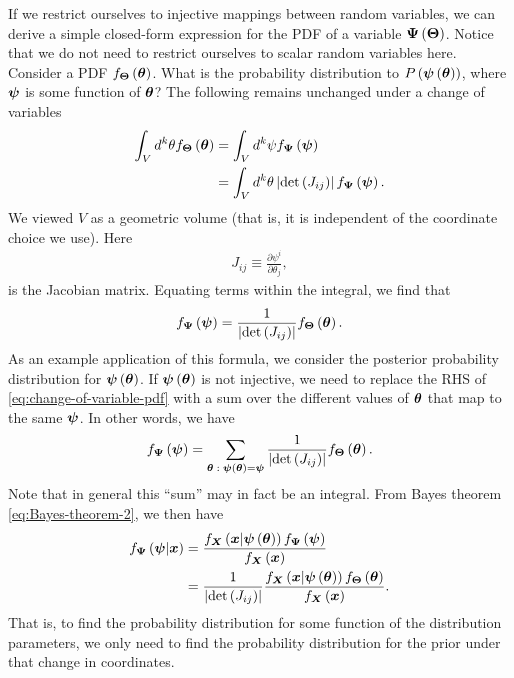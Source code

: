 If we restrict ourselves to injective mappings between random variables, we can derive a simple closed-form expression for the PDF of a variable ${\bm \Psi}\left({\bm \Theta}\right)$.
Notice that we do not need to restrict ourselves to scalar random variables here.
Consider a PDF $f_{{\bm \Theta}}\left({\bm \theta}\right)$.
What is the probability distribution to $P\left({\bm \psi}\left({\bm \theta}\right)\right)$,
where ${\bm \psi}$ is some function of ${\bm \theta}$?
The following remains unchanged under a change of variables
\begin{align}
    \int_V d^k\theta f_{{\bm \Theta}}\left({\bm \theta}\right)
    &=
    \int_{V} d^k\psi f_{{\bm \Psi}}\left({\bm \psi}\right)
    \nonumber\\
    &=
    \int_{V} d^k\theta \left|\det\left(J_{ij}\right)\right| 
        f_{{\bm \Psi}}\left({\bm \psi}\right)
    .
\end{align}
We viewed $V$ as a geometric volume (that is, it is independent of the coordinate choice we use).
Here 
\begin{align}
    \label{eq:Jacobian-matrix}
    J_{ij}
    \equiv
    \frac{\partial\psi^i}{\partial\theta_j}
    ,
\end{align}
is the Jacobian matrix.
Equating terms within the integral, we find that
\begin{align}
    \label{eq:change-of-variable-pdf}
    f_{{\bm \Psi}}\left({\bm \psi}\right)
    =
    \frac{1}{\left|\det\left(J_{ij}\right)\right|} f_{{\bm \Theta}}\left({\bm \theta}\right)
    .
\end{align}
As an example application of this formula, we consider the posterior probability distribution for ${\bm \psi}\left({\bm \theta}\right)$. 
If ${\bm \psi}\left({\bm \theta}\right)$ is not injective, we need to replace the RHS of \eqref{eq:change-of-variable-pdf} with a sum over the different values of ${\bm \theta}$ that map to the same ${\bm \psi}$.
In other words, we have
\begin{align}
    \label{eq:change-of-variable-pdf}
    f_{{\bm \Psi}}\left({\bm \psi}\right)
    =
    \sum_{{\bm \theta} \; : \; {\bm \psi}\left({\bm \theta}\right)={\bm \psi}}
    \frac{1}{\left|\det\left(J_{ij}\right)\right|} f_{{\bm \Theta}}\left({\bm \theta}\right)
    .
\end{align}
Note that in general this ``sum'' may in fact be an integral.
From Bayes theorem \eqref{eq:Bayes-theorem-2}, we then have
\begin{align}
    f_{{\bm \Psi}}\left({\bm \psi}|{\bm x}\right)
    &=
    \frac{
        f_{{\bm X}}\left({\bm x}|{\bm \psi}\left({\bm \theta}\right)\right)
        f_{{\bm \Psi}}\left({\bm \psi}\right)
    }{
        f_{{\bm X}}\left({\bm x}\right)
    }
    \nonumber\\
    &=
    \frac{1}{\left|\det\left(J_{ij}\right)\right|}
    \frac{
        f_{{\bm X}}\left({\bm x}|{\bm \psi}\left({\bm \theta}\right)\right)
        f_{{\bm \Theta}}\left({\bm \theta}\right)
    }{
        f_{{\bm X}}\left({\bm x}\right)
    }
    .
\end{align}
That is, to find the probability distribution for some function of the distribution parameters, we only need to find the probability distribution for the prior under that change in coordinates. 



